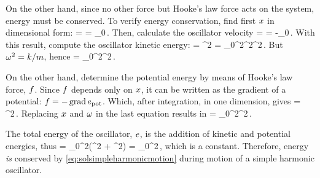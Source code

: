 On the other hand, since no other force but Hooke's law force acts on the system, energy must be conserved. To verify energy conservation, find first $x$ in dimensional form:
\beq
\scpq\odisp = \cos{}\implies
\odisp = \odisp_0\cos{}\,.
\eeq
Then, calculate the oscillator velocity
\beq
\lvel = \ovel = -\odisp_0\natfreq\sin{}\,.
\eeq
With this result, compute the oscillator kinetic energy:
\ken = \mass\lvel^2 = \mass\odisp_0^2\natfreq^2\sin^2\,.
\eeq
But $\omega^2 = k/m$, hence
\ken = \kspring\odisp_0^2\sin^2\,.
\eeq

On the other hand, determine the potential energy by means of Hooke's law force, $f$. Since $f$ depends only on $x$, it can be written as the gradient of a potential: $f = -\operatorname{grad}e_\text{pot}$. Which, after integration, in one dimension, gives 
\pen = \kspring\odisp^2\,.
\eeq
Replacing $x$ and $\omega$ in the last equation results in
\pen = \kspring\odisp_0^2\cos^2\,.
\eeq

The total energy of the oscillator, $e$, is the addition of kinetic and potential energies, thus
\ener = \kspring\odisp_0^2\left(\sin^2 + \cos^2\right)\implies
\ener = \kspring\odisp_0^2\,,
\eeq
which is a constant. Therefore, energy \emph{is} conserved by \cref{eq:solsimpleharmonicmotion} during motion of a simple harmonic oscillator.
